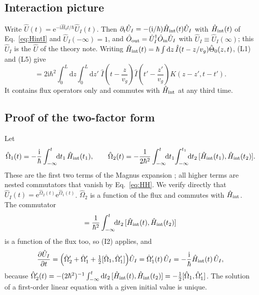 \documentclass[aps,pra,onecolumn,notitlepage,11pt,amsmath,amssymb,nofootinbib]{revtex4-2}
\newcommand{\Iop}{\hat I}
\newcommand{\dd}{\mathrm{d}}
\newcommand{\ee}{\mathrm{e}}
\newcommand{\ii}{\mathrm{i}}
\begin{document}
\subsection{Interaction picture}

Write $\hat U(t)=\ee^{-\ii\hat H_0t/\hbar}\hat U_I(t)$. Then
$\partial_t\hat U_I=-(\ii/\hbar)\hat H_{\rm int}(t)\hat U_I$ with
$\hat H_{\rm int}(t)$ of Eq.~\eqref{eq:HintI} and $\hat U_I(-\infty)=1$, and
$\hat O_{\rm out}=\hat U_I^\dagger\hat O_{\rm in}\hat U_I$ with
$\hat U_I\equiv\hat U_I(\infty)$; this $\hat U_I$ is the $\hat U$ of the theory
note. Writing
$\hat H_{\rm int}(t)=\hbar\int\dd z\,\Iop(t-z/v_g)\hat\Theta_0(z,t)$, (L1) and
(L5) give
\begin{equation}
[\hat H_{\rm int}(t),\hat H_{\rm int}(t')]
=2\ii\hbar^2\!\int_0^L\!\!\dd z\!\int_0^L\!\!\dd z'\;
\Iop\!\left(t-\frac{z}{v_g}\right)\Iop\!\left(t'-\frac{z'}{v_g}\right)K(z-z',t-t').
\label{eq:HH}
\end{equation}
It contains flux operators only and commutes with $\hat H_{\rm int}$ at any
third time.

\subsection{Proof of the two-factor form}

Let
\begin{equation}
\hat\Omega_1(t)=-\frac{\ii}{\hbar}\int_{-\infty}^t\!\!\dd t_1\,\hat H_{\rm int}(t_1),\qquad
\hat\Omega_2(t)=-\frac{1}{2\hbar^2}\int_{-\infty}^t\!\!\dd t_1\!\int_{-\infty}^{t_1}\!\!\dd t_2\,
[\hat H_{\rm int}(t_1),\hat H_{\rm int}(t_2)] .
\end{equation}
These are the first two terms of the Magnus expansion \cite{blanes2009}; all
higher terms are nested commutators that vanish by Eq.~\eqref{eq:HH}. We
verify directly that $\hat U_I(t)=\ee^{\hat\Omega_2(t)}\ee^{\hat\Omega_1(t)}$.
$\hat\Omega_2$ is a function of the flux and commutes with
$\hat H_{\rm int}$. The commutator
\begin{equation}
[\hat\Omega_1(t),\hat\Omega_1'(t)]
=\frac{1}{\hbar^2}\int_{-\infty}^t\!\!\dd t_2\,[\hat H_{\rm int}(t),\hat H_{\rm int}(t_2)]
\end{equation}
is a function of the flux too, so (I2) applies, and
\begin{equation}
\frac{\partial\hat U_I}{\partial t}
=\Big(\hat\Omega_2'+\hat\Omega_1'+\tfrac12[\hat\Omega_1,\hat\Omega_1']\Big)\hat U_I
=\hat\Omega_1'(t)\,\hat U_I=-\frac{\ii}{\hbar}\hat H_{\rm int}(t)\,\hat U_I ,
\end{equation}
because
$\hat\Omega_2'(t)=-(2\hbar^2)^{-1}\int_{-\infty}^t\dd t_2\,[\hat H_{\rm int}(t),\hat H_{\rm int}(t_2)]
=-\tfrac12[\hat\Omega_1,\hat\Omega_1']$. The solution of a first-order linear
equation with a given initial value is unique.
\end{document}
